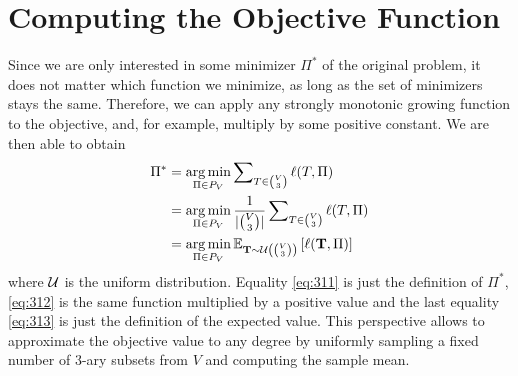 \section{Computing the Objective Function}\label{sec:objective-function}
Since we are only interested in some minimizer $\Pi^*$ of the original problem, it does not matter which function we minimize, as long as the set of minimizers stays the same. Therefore, we can apply any strongly monotonic growing function to the objective, and, for example, multiply by some positive constant. We are then able to obtain
\begin{align}
    \Pi^* &= \operatorname*{\arg\min}_{\Pi \in P_V} \sum\nolimits_{T\in\binom{V}{3}} \ell(T,\Pi) \label{eq:311} \\
    &= \operatorname*{\arg\min}_{\Pi \in P_V} \frac{1}{|\binom{V}{3}|} \sum\nolimits_{T\in\binom{V}{3}} \ell(T,\Pi) \label{eq:312} \\
    &= \operatorname*{\arg\min}_{\Pi \in P_V} \mathbb{E}_{{\bf T} \sim \mathcal{U}\left(\binom{V}{3}\right)} \left[\ell({\bf T}, \Pi)\right] \label{eq:313}
\end{align}
where $\mathcal{U}$ is the uniform distribution. Equality \eqref{eq:311} is just the definition of $\Pi^*$, \eqref{eq:312} is the same function multiplied by a positive value and the last equality \eqref{eq:313} is just the definition of the expected value. This perspective allows to approximate the objective value to any degree by uniformly sampling a fixed number of $3$-ary subsets from $V$ and computing the sample mean.


